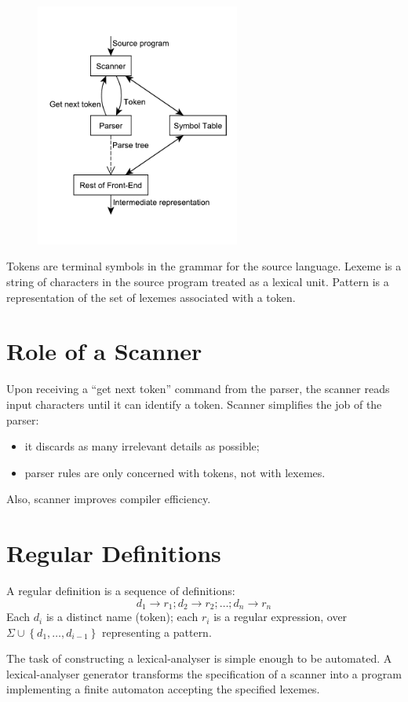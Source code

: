 \begin{figure}[H]
	\centerline{\includegraphics[width=0.6\textwidth]{img/13.pdf}}
\end{figure}

Tokens are terminal symbols in the grammar for the source language.
Lexeme is a string of characters in the source program treated as a lexical unit.
Pattern is a representation of the set of lexemes associated with a token.

\section{Role of a Scanner}
Upon receiving a ``get next token'' command from the parser, the scanner reads input characters until it can identify a token.
Scanner simplifies the job of the parser:
\begin{itemize}
	\item it discards as many irrelevant details as possible;
	\item parser rules are only concerned with tokens, not with lexemes.
\end{itemize}
Also, scanner improves compiler efficiency.

\section{Regular Definitions}
A regular definition is a sequence of definitions:
$$
	d_1 \to r_1; d_2 \to r_2; \ldots; d_n \to r_n
$$
Each $d_i$ is a distinct name (token); each $r_i$ is a regular expression, over $\Sigma \cup \left\{d_1, \ldots, d_{i-1}\right\}$ representing a pattern.

The task of constructing a lexical-analyser is simple enough to be automated.
A lexical-analyser generator transforms the specification of a scanner into a program implementing a finite automaton accepting the specified lexemes.